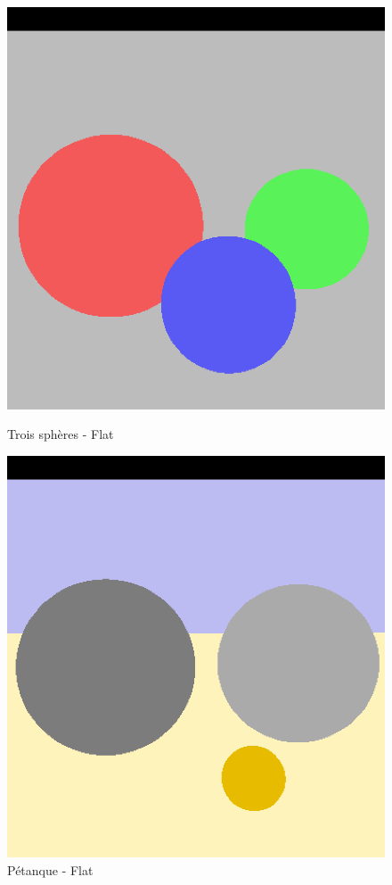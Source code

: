 \documentclass{article}
\begin{document}
\begin{figure}[htb!]
\centering
\begin{minipage}{.45\textwidth}
  \centering
  \includegraphics[width=\linewidth]{results/troisSpheres_flat.png}
  \caption{Trois sphères - Flat}
  \label{fig:tsflat}
\end{minipage}\hfill
\begin{minipage}{.45\textwidth}
  \centering
  \includegraphics[width=\linewidth]{results/petanque_flat.png}
  \caption{Pétanque - Flat}
  \label{fig:pflat}
\end{minipage}
\end{figure}
\end{document}

